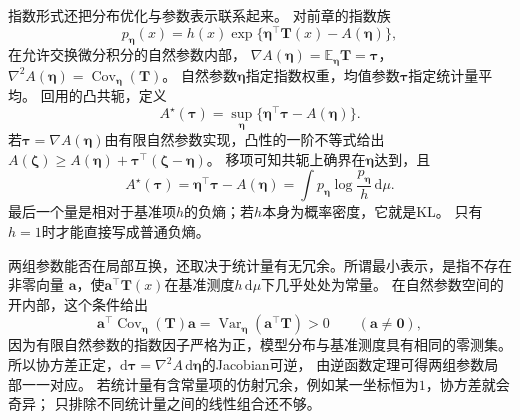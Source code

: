 指数形式还把分布优化与参数表示联系起来。
对前章的指数族
\[
  p_{\bm\eta}(x)
  =h(x)\exp\{\bm\eta^\top\bm T(x)-A(\bm\eta)\},
\]
在允许交换微分积分的自然参数内部，
\(\nabla A(\bm\eta)=\mathbb E_{\bm\eta}\bm T=\bm\tau\)，
\(\nabla^2A(\bm\eta)=\operatorname{Cov}_{\bm\eta}(\bm T)\)。
自然参数\(\bm\eta\)指定指数权重，均值参数\(\bm\tau\)指定统计量平均。
回用的凸共轭，定义
\begin{equation}
  A^\star(\bm\tau)
  =\sup_{\bm\eta}\{\bm\eta^\top\bm\tau-A(\bm\eta)\}.
  \label{eq:information-log-partition-conjugate}
\end{equation}
若\(\bm\tau=\nabla A(\bm\eta)\)由有限自然参数实现，凸性的一阶不等式给出
\(A(\bm\zeta)\geq A(\bm\eta)+\bm\tau^\top(\bm\zeta-\bm\eta)\)。
移项可知共轭上确界在\(\bm\eta\)达到，且
\[
  A^\star(\bm\tau)=\bm\eta^\top\bm\tau-A(\bm\eta)
  =\int p_{\bm\eta}\log\frac{p_{\bm\eta}}h\,\mathrm d\mu.
\]
最后一个量是相对于基准项\(h\)的负熵；若\(h\)本身为概率密度，它就是KL。
只有\(h=1\)时才能直接写成普通负熵。

两组参数能否在局部互换，还取决于统计量有无冗余。所谓最小表示，是指不存在非零向量
\(\bm a\)，使\(\bm a^\top\bm T(x)\)在基准测度\(h\,\mathrm d\mu\)下几乎处处为常量。
在自然参数空间的开内部，这个条件给出
\[
 \bm a^\top\operatorname{Cov}_{\bm\eta}(\bm T)\bm a
 =\operatorname{Var}_{\bm\eta}(\bm a^\top\bm T)>0
 \qquad(\bm a\neq\bm0),
\]
因为有限自然参数的指数因子严格为正，模型分布与基准测度具有相同的零测集。
所以协方差正定，\(\mathrm d\bm\tau=\nabla^2A\,\mathrm d\bm\eta\)的Jacobian可逆，
由逆函数定理可得两组参数局部一一对应。
若统计量有含常量项的仿射冗余，例如某一坐标恒为\(1\)，协方差就会奇异；
只排除不同统计量之间的线性组合还不够。

